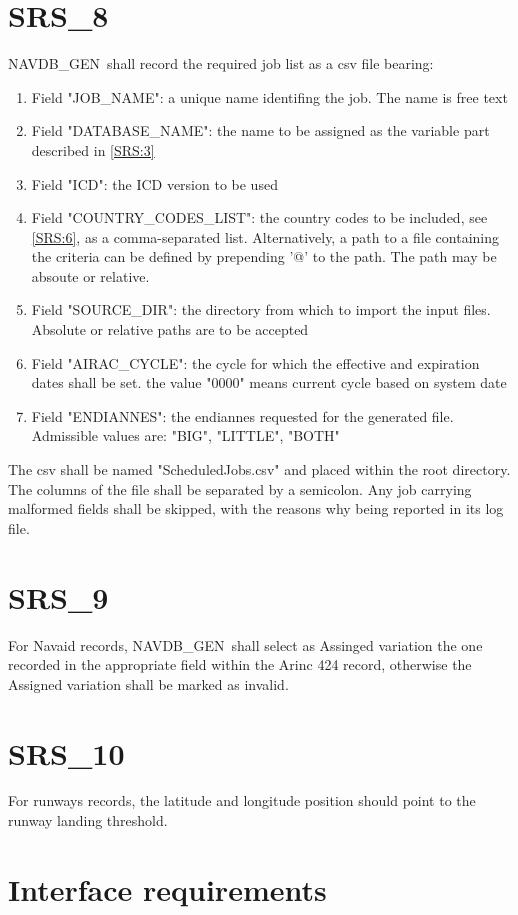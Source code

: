 \documentclass{scrreprt}
\def\NAVDBGEN{NAVDB\_GEN}
\begin{document}
\section{SRS\_8}
\label{SRS:8}
\NAVDBGEN\ shall record the required job list as a csv file bearing:
\begin{enumerate}
  \item Field "JOB\_NAME": a unique name identifing the job. The name is free text
  \item Field "DATABASE\_NAME": the name to be assigned as the variable part described in \ref{SRS:3}
  \item Field "ICD": the ICD version to be used
  \item Field "COUNTRY\_CODES\_LIST": the country codes to be included, see \ref{SRS:6}, as a comma-separated list. Alternatively, a path to a file containing the criteria can be defined by prepending '@' to the path. The path may be absoute or relative.
  \item Field "SOURCE\_DIR": the directory from which to import the input files. Absolute or relative paths are to be accepted
  \item Field "AIRAC\_CYCLE": the cycle for which the effective and expiration dates shall be set. the value "0000" means current cycle based on system date
  \item Field "ENDIANNES": the endiannes requested for the generated file. Admissible values are: "BIG", "LITTLE", "BOTH"
\end{enumerate}
The csv shall be named "ScheduledJobs.csv" and placed within the root directory. The columns of the file shall be separated by a semicolon.
Any job carrying malformed fields shall be skipped, with the reasons why being reported in its log file.
\section{SRS\_9}
For Navaid records, \NAVDBGEN\ shall select as Assinged variation the one recorded in the appropriate field within the Arinc 424 record, otherwise the Assigned variation shall be marked as invalid.
\section{SRS\_10}
For runways records, the latitude and longitude position should point to the runway landing threshold.
\setcounter{secnumdepth}{2}
\section{Interface requirements}
\end{document}
